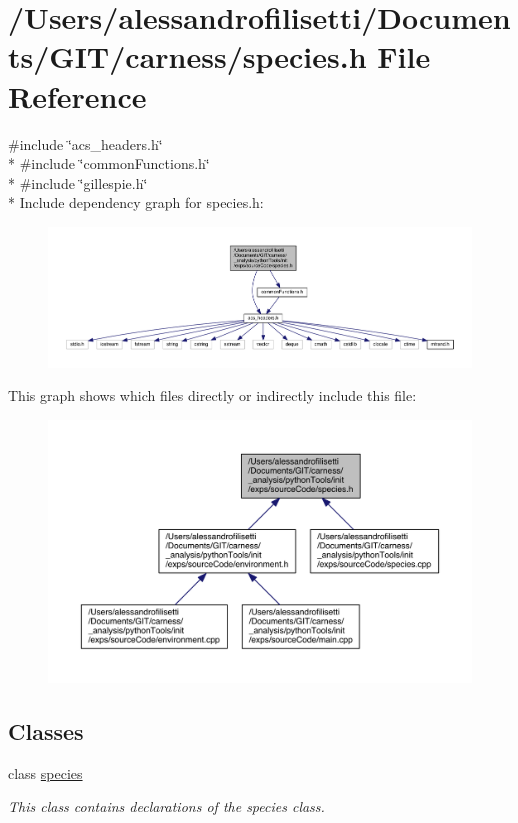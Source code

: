 \hypertarget{a00081}{\section{/\-Users/alessandrofilisetti/\-Documents/\-G\-I\-T/carness/species.h File Reference}
\label{a00081}
}
{\ttfamily \#include \char`\"{}acs\-\_\-headers.\-h\char`\"{}}\\*
{\ttfamily \#include \char`\"{}common\-Functions.\-h\char`\"{}}\\*
{\ttfamily \#include \char`\"{}gillespie.\-h\char`\"{}}\\*
Include dependency graph for species.\-h\-:
\nopagebreak
\begin{figure}[H]
\begin{center}
\leavevmode
\includegraphics[width=350pt]{a00204}
\end{center}
\end{figure}
This graph shows which files directly or indirectly include this file\-:
\nopagebreak
\begin{figure}[H]
\begin{center}
\leavevmode
\includegraphics[width=350pt]{a00205}
\end{center}
\end{figure}
\subsection*{Classes}
\begin{DoxyCompactItemize}
\item 
class \hyperlink{a00022}{species}
\begin{DoxyCompactList}\small\item\em This class contains declarations of the species class. \end{DoxyCompactList}\end{DoxyCompactItemize}
